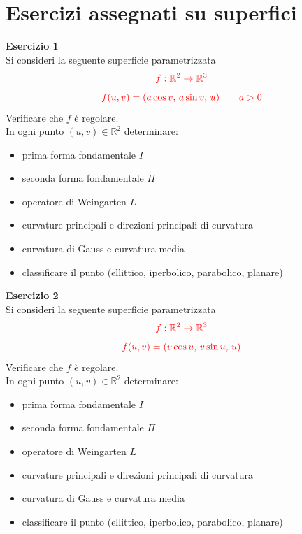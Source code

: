     \section{Esercizi assegnati su superfici}
        \textbf{Esercizio 1}\\
        Si consideri la seguente superficie parametrizzata
        \[
        \color{red} f : \mathbb{R}^2 \to \mathbb{R}^3
        \]
        \[
        \color{red} f(u,v) = (a \cos v, \, a \sin v, \, u) \qquad a > 0
        \]
        Verificare che $f$ è regolare.\\
        In ogni punto $(u,v) \in \mathbb{R}^2$ determinare:
        \begin{itemize}
            \item prima forma fondamentale $I$
            \item seconda forma fondamentale $\Pi$
            \item operatore di Weingarten $L$
            \item curvature principali e direzioni principali di curvatura
            \item curvatura di Gauss e curvatura media
            \item classificare il punto (ellittico, iperbolico, parabolico, planare)
        \end{itemize}

        \newpage

        \noindent \textbf{Esercizio 2}\\
        Si consideri la seguente superficie parametrizzata
        \[
        \color{red} f : \mathbb{R}^2 \to \mathbb{R}^3
        \]
        \[
        \color{red} f(u,v) = (v \cos u, \, v \sin u, \, u)
        \]
        Verificare che $f$ è regolare.\\
        In ogni punto $(u,v) \in \mathbb{R}^2$ determinare:
        \begin{itemize}
            \item prima forma fondamentale $I$
            \item seconda forma fondamentale $\Pi$
            \item operatore di Weingarten $L$
            \item curvature principali e direzioni principali di curvatura
            \item curvatura di Gauss e curvatura media
            \item classificare il punto (ellittico, iperbolico, parabolico, planare)
        \end{itemize}
